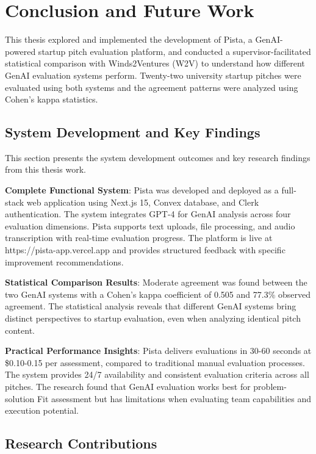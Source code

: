 \chapter{Conclusion and Future Work}
\label{ch:conclusion}

This thesis explored and implemented the development of Pista, a  GenAI-powered startup pitch evaluation platform, and conducted a supervisor-facilitated statistical comparison with Winds2Ventures (W2V) to understand how different GenAI evaluation systems perform. Twenty-two university startup pitches were evaluated using both systems and the agreement patterns were analyzed using Cohen's kappa statistics.

\section{System Development and Key Findings}
\label{sec:accomplishments}

This section presents the system development outcomes and key research findings from this thesis work.

\textbf{Complete Functional System}: Pista was developed and deployed as a full-stack web application using Next.js 15, Convex database, and Clerk authentication. The system integrates GPT-4 for GenAI analysis across four evaluation dimensions. Pista supports text uploads, file processing, and audio transcription with real-time evaluation progress. The platform is live at https://pista-app.vercel.app and provides structured feedback with specific improvement recommendations.

\textbf{Statistical Comparison Results}: Moderate agreement was found between the two GenAI systems with a Cohen's kappa coefficient of 0.505 and 77.3\% observed agreement. The statistical analysis reveals that different GenAI systems bring distinct perspectives to startup evaluation, even when analyzing identical pitch content.

\textbf{Practical Performance Insights}: Pista delivers evaluations in 30-60 seconds at \$0.10-0.15 per assessment, compared to traditional manual evaluation processes. The system provides 24/7 availability and consistent evaluation criteria across all pitches. The research found that GenAI evaluation works best for problem-solution Fit assessment but has limitations when evaluating team capabilities and execution potential.

\section{Research Contributions}
\label{sec:contributions}

